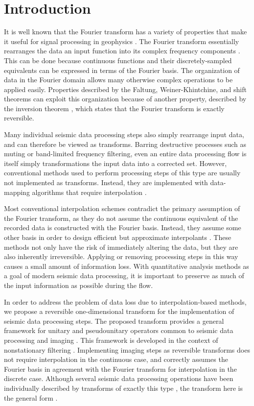 \section{Introduction}
It is well known that the Fourier transform has a variety of properties that make it useful for signal processing in geophysics \cite{yilmaz01}.
The Fourier transform essentially rearranges the data an input function into its complex frequency components \cite{karl89}.
This can be done because continuous functions and their discretely-sampled equivalents can be expressed in terms of the Fourier basis.
The organization of data in the Fourier domain allows many otherwise complex operations to be applied easily.
Properties described by the Faltung, Weiner-Khintchine, and shift theorems \cite{sneddon95} can exploit this organization because of another property, described by the inversion theorem \cite{sneddon95}, which states that the Fourier transform is exactly reversible.   

Many individual seismic data processing steps also simply rearrange input data, and can therefore be viewed as transforms.
Barring destructive processes such as muting or band-limited frequency filtering, even an entire data processing flow is itself simply transformations the input data into a corrected set.
However, conventional methods used to perform processing steps of this type are usually not implemented as transforms.
Instead, they are implemented with data-mapping algorithms that require interpolation \cite{harlan82}.

Most conventional interpolation schemes contradict the primary assumption of the Fourier transform, as they do not assume the continuous equivalent of the recorded data is constructed with the Fourier basis.
Instead, they assume some other basis in order to design efficient but approximate interpolants \cite[]{karl89}.
These methods not only have the risk of immediately altering the data, but they are also inherently irreversible.
Applying or removing processing steps in this way causes a small amount of information loss.
With quantitative analysis methods as a goal of modern seismic data processing, it is important to preserve as much of the input information as possible during the flow.    

In order to address the problem of data loss due to interpolation-based methods, we propose a reversible one-dimensional transform for the implementation of seismic data processing steps.  
The proposed transform provides a general framework for unitary and pseudounitary operators common to seismic data processing and imaging \cite{biondi_claerbout85,claerbout92}.  This framework is developed in the context of nonstationary filtering \cite{margrave98}.
Implementing imaging steps as reversible transforms does not require interpolation in the continuous case, and correctly assumes the Fourier basis in agreement with the Fourier transform for interpolation in the discrete case. Although several seismic data processing operations have been individually described by transforms of exactly this type \cite{margrave98,margrave_ferguson99,margrave01,claerbout92}, the transform here is the general form \cite{burnett07,burnett_ferguson08b}.

